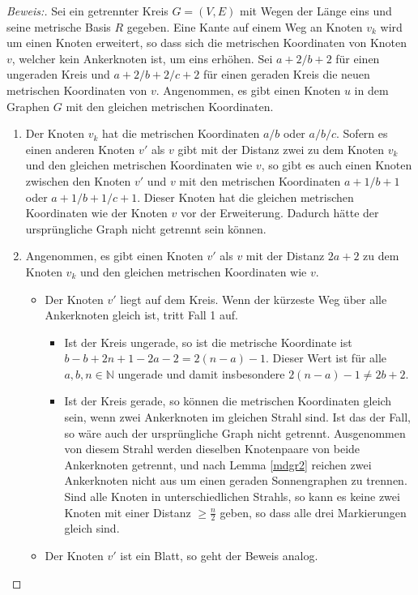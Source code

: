\begin{proof}[Beweis:]
Sei ein getrennter Kreis $G=(V,E)$ mit Wegen der Länge eins und seine metrische Basis $R$ gegeben. Eine Kante auf einem Weg an Knoten $v_k$ wird um einen Knoten erweitert, so dass sich die metrischen Koordinaten von Knoten $v$, welcher kein Ankerknoten ist, um eins erhöhen. Sei $a+2/b+2$ für einen ungeraden Kreis und $a+2/b+2/c+2$ für einen geraden Kreis die neuen metrischen Koordinaten von $v$. Angenommen, es gibt einen Knoten $u$ in dem Graphen $G$ mit den gleichen metrischen Koordinaten.
\begin{enumerate}
\item Der Knoten $v_k$ hat die metrischen Koordinaten $a/b$ oder $a/b/c$. Sofern es einen anderen Knoten $v'$ als $v$ gibt mit der Distanz zwei zu dem Knoten $v_k$ und den gleichen metrischen Koordinaten wie $v$, so gibt es auch einen Knoten zwischen den Knoten $v'$ und $v$ mit den metrischen Koordinaten $a+1/b+1$ oder $a+1/b+1/c+1$. Dieser Knoten hat die gleichen metrischen Koordinaten wie der Knoten $v$ vor der Erweiterung. Dadurch hätte der ursprüngliche Graph nicht getrennt sein können.
\item Angenommen, es gibt einen Knoten $v'$ als $v$ mit der Distanz $2a+2$ zu dem Knoten $v_k$ und den gleichen metrischen Koordinaten wie $v$.
\begin{itemize}
\item Der Knoten $v'$ liegt auf dem Kreis. Wenn der kürzeste Weg über alle Ankerknoten gleich ist, tritt Fall 1 auf.
\begin{itemize}
\item Ist der Kreis ungerade, so ist die metrische Koordinate ist $b-b+2n+1-2a-2=2(n-a)-1$. Dieser Wert ist für alle $a,b,n \in \mathbb{N}$ ungerade und damit insbesondere $2(n-a)-1\neq 2b+2$. 
\item Ist der Kreis gerade, so können die metrischen Koordinaten gleich sein, wenn zwei Ankerknoten im gleichen Strahl sind. Ist das der Fall, so wäre auch der ursprüngliche Graph nicht getrennt. Ausgenommen von diesem Strahl werden dieselben Knotenpaare von beide Ankerknoten getrennt, und nach Lemma \ref{mdgr2} reichen zwei Ankerknoten nicht aus um einen geraden Sonnengraphen zu trennen. Sind alle Knoten in unterschiedlichen Strahls, so kann es keine zwei Knoten mit einer Distanz $\geq \frac{n}{2}$ geben, so dass alle drei Markierungen gleich sind.
\end{itemize}
\item Der Knoten $v'$ ist ein Blatt, so geht der Beweis analog.

\end{itemize}
\end{enumerate}
\end{proof}
